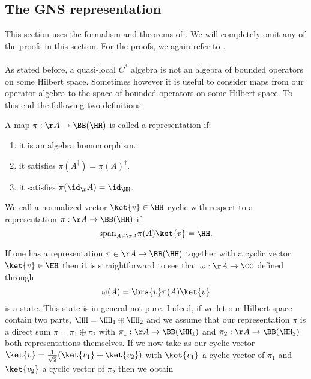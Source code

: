 \subsection{The GNS representation}\label{sec:the-gns-representation}
This section uses the formalism and theorems of \cite{bratteli1979operator}. We will completely omit any of the proofs in this section. For the proofs, we again refer to \cite{bratteli1979operator}.\\\\
As stated before, a quasi-local $C^*$ algebra is not an algebra of bounded operators on some Hilbert space. Sometimes however it is useful to consider maps from our operator algebra to the space of bounded operators on some Hilbert space. To this end the following two definitions:
\begin{definition}[representation]
	A map $\pi:\AA\rightarrow \BB(\HH)$ is called a representation if:
	\begin{enumerate}
		\item it is an algebra homomorphism.
		\item it satisfies $\pi(A^\dagger)=\pi(A)^\dagger$.
		\item it satisfies $\pi(\id_\AA)=\id_{\HH}$.
	\end{enumerate}
\end{definition}
\begin{definition}
	We call a normalized vector $\ket{v}\in\HH$ cyclic with respect to a representation $\pi:\AA\rightarrow \BB(\HH)$ if
	\begin{equation}
	\textrm{span}_{A\in\AA}\pi(A)\ket{v}=\HH.
	\end{equation}
\end{definition}
If one has a representation $\pi\in\AA\rightarrow\BB(\HH)$ together with a cyclic vector $\ket{v}\in\HH$ then it is straightforward to see that $\omega:\AA\rightarrow\CC$ defined through
\begin{equation}\label{eq:StateBelongingToRepresentation}
\omega(A)=\bra{v}\pi(A)\ket{v}
\end{equation}
is a state. This state is in general not pure. Indeed, if we let our Hilbert space contain two parts, $\HH=\HH_1\oplus\HH_2$ and we assume that our representation $\pi$ is a direct sum $\pi=\pi_1\oplus\pi_2$ with $\pi_1:\AA\rightarrow\BB(\HH_1)$ and $\pi_2:\AA\rightarrow\BB(\HH_2)$ both representations themselves. If we now take as our cyclic vector $\ket{v}=\frac{1}{\sqrt{2}}(\ket{v_1}+\ket{v_2})$ with $\ket{v_1}$ a cyclic vector of $\pi_1$ and $\ket{v_2}$ a cyclic vector of $\pi_2$ then we obtain
